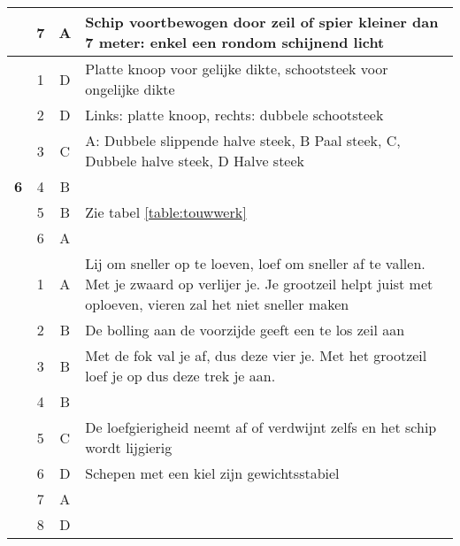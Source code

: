 \begin{table}[h]
\begin{tabular}{c|c|c|m{9.5cm}}
   		& 7 & A &  Schip voortbewogen door zeil of spier kleiner dan 7 meter: enkel een rondom schijnend licht\\ \cline{2-4} \hline
   		\multirow{7}{*}{\sffamily\bfseries{\textcolor{ocre}{\LARGE6}} } 
   		& 1 & D & Platte knoop voor gelijke dikte, schootsteek voor ongelijke dikte \\ \cline{2-4} 
   		& 2 & D & Links: platte knoop, rechts: dubbele schootsteek \\ \cline{2-4} 
   		& 3 & C & A: Dubbele slippende halve steek, B Paal steek, C, Dubbele halve steek, D Halve steek \\ \cline{2-4} 
   		& 4 & B &  \\ \cline{2-4} 
   		& 5 & B &  Zie tabel \ref{table:touwwerk}\\ \cline{2-4} 
   		& 6 & A &  \\ \cline{2-4} \hline 
  		\multirow{8}{*}{\sffamily\bfseries{\textcolor{ocre}{\LARGE7}} } 
   		& 1 & A &  Lij om sneller op te loeven, loef om sneller af te vallen. Met
   		je zwaard op verlijer je. Je grootzeil helpt juist met oploeven,
   		vieren zal het niet sneller maken \\ \cline{2-4} 
   		& 2 & B &  De bolling aan de voorzijde geeft een te los zeil aan\\ \cline{2-4} 
   		& 3 & B &  Met de fok val je af, dus deze vier je. Met het grootzeil loef je
   		op dus deze trek je aan.\\ \cline{2-4} 
   		& 4 & B &  \\ \cline{2-4} 
   		& 5 & C &  De loefgierigheid  neemt af of verdwijnt zelfs en het schip wordt lijgierig  \\ \cline{2-4} 
   		& 6 & D &  Schepen met een kiel zijn gewichtsstabiel\\ \cline{2-4} 
   		& 7 & A &  \\ \cline{2-4}
   		& 8 & D &  \\ \cline{2-4} \hline
	\end{tabular}
\end{table}
